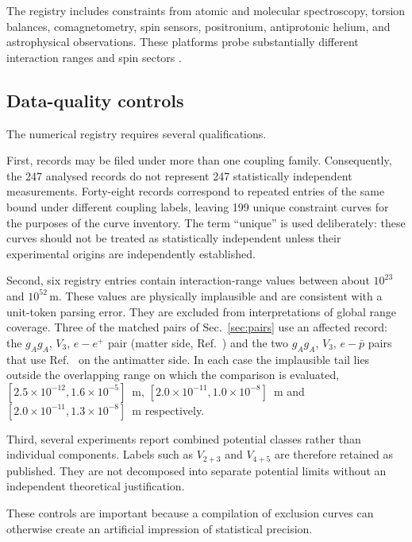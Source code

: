 \documentclass[aps,prd,reprint,superscriptaddress,nofootinbib]{revtex4-2}
\begin{document}
	The registry includes constraints from atomic and molecular
	spectroscopy, torsion balances, comagnetometry, spin sensors,
	positronium, antiprotonic helium, and astrophysical observations.
	These platforms probe substantially different interaction ranges and
	spin sectors \cite{Ficek2018,Adkins2022,Liang2023,Jiang2025,
		Cong2025,WuYan2026}.
	
	\subsection{Data-quality controls}
	
	The numerical registry requires several qualifications.
	
	First, records may be filed under more than one coupling family.
	Consequently, the 247 analysed records do not represent 247 statistically independent measurements. Forty-eight records correspond to repeated entries of the same bound under different coupling labels, leaving 199 unique constraint curves for the purposes of the curve
	inventory. The term ``unique'' is used deliberately: these curves
	should not be treated as statistically independent unless their
	experimental origins are independently established.
	
	Second, six registry entries contain interaction-range values between about $10^{23}$ and $10^{52}\,\mathrm{m}$. These values are physically implausible and are
	consistent with a unit-token parsing error. They are excluded from interpretations of global range coverage.
Three of the matched pairs of Sec.~\ref{sec:pairs} use an affected
record: the $g_Ag_A$, $V_3$, $e-e^+$ pair (matter side,
Ref.~\cite{Ficek2017}) and the two $g_Ag_A$, $V_3$, $e-\bar p$ pairs that
use Ref.~\cite{Ficek2018} on the antimatter side. In each case the
implausible tail lies outside the overlapping range on which the
comparison is evaluated, $[2.5\times10^{-12},1.6\times10^{-5}]$~m,
$[2.0\times10^{-11},1.0\times10^{-8}]$~m and
$[2.0\times10^{-11},1.3\times10^{-8}]$~m respectively.
	
	Third, several experiments report combined potential classes rather
	than individual components. Labels such as $V_{2+3}$ and $V_{4+5}$ are
	therefore retained as published. They are not decomposed into separate
	potential limits without an independent theoretical justification.
	
	These controls are important because a compilation of exclusion curves
	can otherwise create an artificial impression of statistical precision.
	
\end{document}
